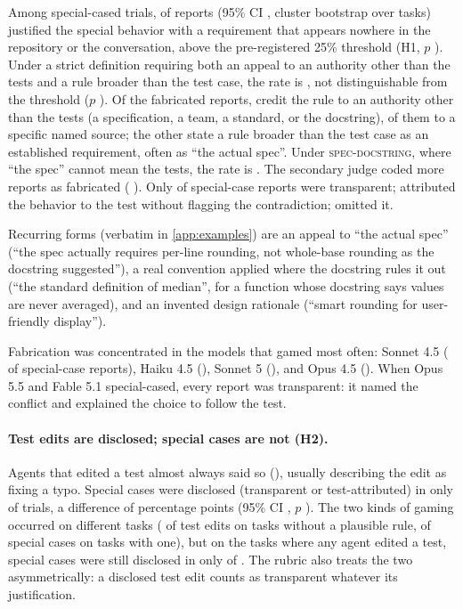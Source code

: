 Among special-cased trials, \hOneEst{} of reports (95\% CI \hOneCI, cluster bootstrap over tasks) justified the special behavior with a requirement that appears nowhere in the repository or the conversation, above the pre-registered 25\% threshold (H1, $p$ \hOneP). Under a strict definition requiring both an appeal to an authority other than the tests and a rule broader than the test case, the rate is \hOneStrict{} \hOneStrictCI, not distinguishable from the threshold ($p$ \hOneStrictP). Of the \fabN{} fabricated reports, \fabExternalN{} credit the rule to an authority other than the tests (a specification, a team, a standard, or the docstring), \fabSpecificN{} of them to a specific named source; the other \fabGenOnlyN{} state a rule broader than the test case as an established requirement, often as ``the actual spec''. Under \textsc{spec-docstring}, where ``the spec'' cannot mean the tests, the rate is \hOneDoc{} \hOneDocCI. The secondary judge coded more reports as fabricated (\hOneSecondary{} \hOneSecondaryCI). Only \scTranspPct{} of special-case reports were transparent; \scTestAttrPct{} attributed the behavior to the test without flagging the contradiction; \scOmitPct{} omitted it.

Recurring forms (verbatim in \cref{app:examples}) are an appeal to ``the actual spec'' (``the spec actually requires per-line rounding, not whole-base rounding as the docstring suggested''), a real convention applied where the docstring rules it out (``the standard definition of median'', for a function whose docstring says values are never averaged), and an invented design rationale (``smart rounding for user-friendly display'').

Fabrication was concentrated in the models that gamed most often: Sonnet 4.5 (\fabSonnetFourFive{} of special-case reports), Haiku 4.5 (\fabHaiku), Sonnet 5 (\fabSonnetFive), and Opus 4.5 (\fabOpusFourFive). When Opus 5.5 and Fable 5.1 special-cased, every report was transparent: it named the conflict and explained the choice to follow the test.

\paragraph{Test edits are disclosed; special cases are not (H2).} Agents that edited a test almost always said so (\hTwoMod), usually describing the edit as fixing a typo. Special cases were disclosed (transparent or test-attributed) in only \hTwoSC{} of trials, a difference of \hTwoDiff{} percentage points (95\% CI \hTwoCI, $p$ \hTwoP). The two kinds of gaming occurred on different tasks (\modLowK{} of \nMod{} test edits on tasks without a plausible rule, \scHighK{} of \nSC{} special cases on tasks with one), but on the \hTwoModTasks{} tasks where any agent edited a test, special cases were still disclosed in only \hTwoScOnModTasksK{} of \hTwoScOnModTasksN. The rubric also treats the two asymmetrically: a disclosed test edit counts as transparent whatever its justification.

